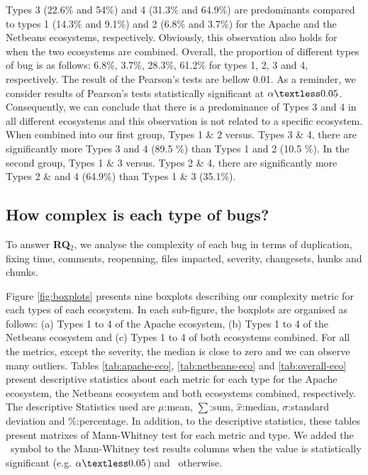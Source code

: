 Types 3 (22.6\% and 54\%) and 4 (31.3\% and 64.9\%) are predominants compared to types 1 (14.3\% and 9.1\%) and 2 (6.8\% and 3.7\%) for the Apache and the Netbeans ecosystems, respectively.
Obviously, this observation also holds for when the two ecosystems are combined.
Overall, the proportion of different types of bug is as follows: 6.8\%, 3.7\%, 28.3\%, 61.2\% for types 1, 2, 3 and 4, respectively.
The result of the Pearson's tests are bellow 0.01.
As a reminder, we consider results of Pearson's tests statistically significant at $\alpha \textless0.05$.
Consequently, we can conclude that there is a predominance of Types 3 and 4 in all different ecosystems and this observation is not related to a specific ecosystem.
When combined into our first group, Types 1 \& 2 versus. Types 3 \& 4, there are significantly more Types 3 and 4 (89.5 \%) than Types 1 and 2 (10.5 \%).
In the second group, Types 1 \& 3 versus. Types 2 \& 4, there are significantly more Types 2 \& and 4 (64.9\%) than Types 1 \& 3 (35.1\%).



\subsection{How complex is each type of bugs?}

To answer {\bf RQ$_2$}, we analyse the complexity of each bug in terms of duplication, fixing time, comments, reopenning, files impacted, severity, changesets, hunks and chunks.

Figure \ref{fig:boxplots} presents nine boxplots describing our complexity metric for each types of each ecosystem.
In each sub-figure, the boxplots are organised as follows: (a) Types 1 to 4 of the Apache ecosystem, (b) Types 1 to 4 of the Netbeans ecosystem and (c) Types 1 to 4 of both ecosystems combined.
For all the metrics, except the severity, the median is close to zero and we can observe many outliers.
Tables \ref{tab:apache-eco}, \ref{tab:netbeans-eco} and \ref{tab:overall-eco} present descriptive statistics about each metric for each type for the Apache ecosystem, the Netbeans ecosystem and both ecosystems combined, respectively.
The descriptive Statistics used are $\mu$:mean, $\sum$:sum, $\hat{x}$:median, $\sigma$:standard deviation and $\%$:percentage.
In addition, to the descriptive statistics, these tables present matrixes of Mann-Whitney test for each metric and type.
We added the \checkmark~symbol to the Mann-Whitney test results columns when the value is statistically significant (e.g. $\alpha \textless 0.05$) and \xmark~otherwise.

